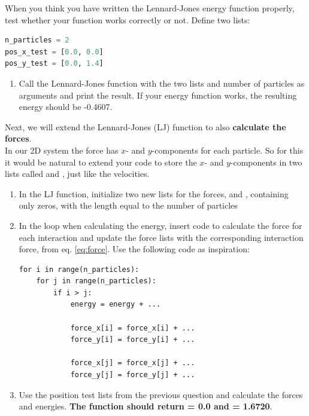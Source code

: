 \documentclass{article}
\begin{document}
When you think you have written the Lennard-Jones energy function properly, test whether your function works correctly or not.
Define two lists:

\begin{lstlisting}[language=python]
n_particles = 2
pos_x_test = [0.0, 0.0]
pos_y_test = [0.0, 1.4]
\end{lstlisting}

\begin{enumerate}[resume]

    \item Call the Lennard-Jones function with the two lists and number of particles as arguments and print the result.
        If your energy function works, the resulting energy should be -0.4607.

\end{enumerate}

Next, we will extend the Lennard-Jones (LJ) function to also {\bf calculate the forces}. \\

In our 2D system the force has $x$- and $y$-components for each particle.
So for this it would be natural to extend your code to store the $x$- and $y$-components in two lists called  and , just like the velocities.

\begin{enumerate}[resume]

    \item In the LJ function, initialize two new lists for the forces,  and , containing only zeros, with the length equal to the number of particles
%

    \item In the loop when calculating the energy, insert code to calculate the force for each interaction and update the force lists with the corresponding interaction force, from eq. \ref{eq:force}.
        Use the following code as inspiration:

\begin{lstlisting}
for i in range(n_particles):
    for j in range(n_particles):
        if i > j:
            energy = energy + ...

            force_x[i] = force_x[i] + ...
            force_y[i] = force_y[i] + ...

            force_x[j] = force_x[j] + ...
            force_y[j] = force_y[j] + ...
\end{lstlisting}

    \item Use the position test lists from the previous question and calculate the forces and energies.
       {\bf The function should return  = 0.0 and  = 1.6720}.

\end{enumerate}
\end{document}
